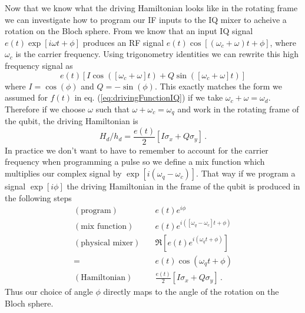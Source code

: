 Now that we know what the driving Hamiltonian looks like in the rotating frame we can investigate how to program our IF inputs to the IQ mixer to acheive a rotation on the Bloch sphere.
From  we know that an input IQ signal $e(t)\exp\left[i\omega t + \phi\right]$ produces an RF signal $ e(t)\cos\left[(\omega_c+\omega)t + \phi \right]$, where $\omega_c$ is the carrier frequency.
Using trigonometry identities we can rewrite this high frequency signal as
\begin{equation}
  e(t)
  \left[
      I \cos(\left[\omega_c + \omega \right] t)
    + Q \sin(\left[\omega_c + \omega \right] t)
  \right]
  \nonumber
\end{equation}
where $I=\cos(\phi)$ and $Q=-\sin(\phi)$.
This exactly matches the form we assumed for $f(t)$ in eq. (\ref{eq:drivingFunctionIQ}) if we take $\omega_c + \omega = \omega_d$.
Therefore if we choose $\omega$ such that $\omega + \omega_c = \omega_q$ and work in the rotating frame of the qubit, the driving Hamiltonian is
\begin{equation}
  H_d/h_d = \frac{e(t)}{2}\left[I\sigma_x + Q\sigma_y\right] \, .
\end{equation}
In practice we don't want to have to remember to account for the carrier frequency when programming a pulse so we define a mix function which multiplies our complex signal by $\exp\left[i(\omega_{q} - \omega_c)\right]$.
That way if we program a signal $\exp\left[i\phi\right]$ the driving Hamiltonian in the frame of the qubit is produced in the following steps
\begin{align*}
  (\text{program}) \quad & e(t) e^{i\phi} \\
  (\text{mix function}) \quad & e(t) e^{i([\omega_q-\omega_c]t + \phi)} \\
  (\text{physical mixer}) \quad & \Re \left[ e(t) e^{i(\omega_q t + \phi)} \right] \\
  = & e(t) \cos\left(\omega_q t + \phi \right) \\
  (\text{Hamiltonian}) \quad & \frac{e(t)}{2}\left[ I \sigma_x + Q \sigma_y \right] \, .
\end{align*}
Thus our choice of angle $\phi$ directly maps to the angle of the rotation on the Bloch sphere.


